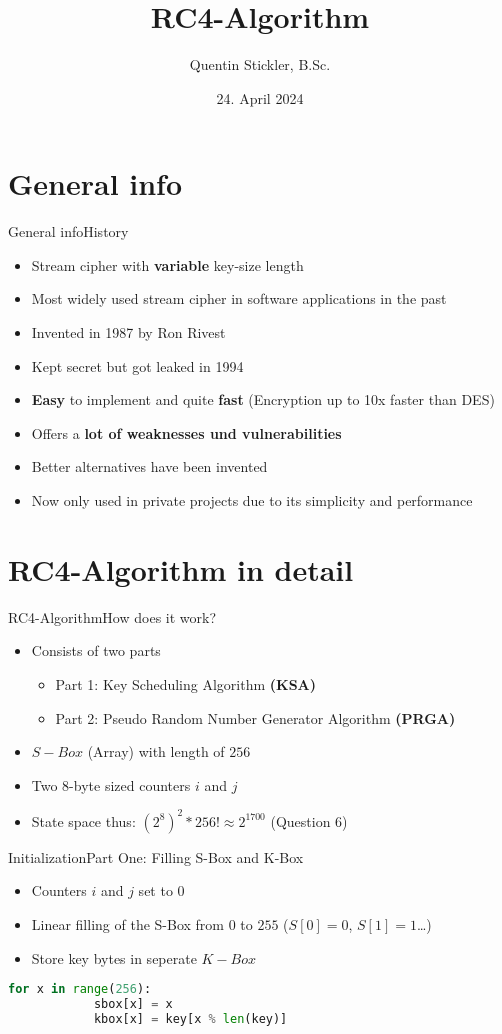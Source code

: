 \documentclass[
	aspectratio=169,	%
	onlytextwidth,		%
	t					%
	]{beamer}
\title[RC4-Algorithm]{RC4-Algorithm}
\author[Quentin Stickler]{Quentin Stickler, B.Sc.}
\date{24. April 2024} %
\begin{document}
\section{General info}

\begin{frame}[fragile]{General info}{History}
	\begin{itemize}
		\item Stream cipher with \textbf{variable} key-size length
		\item Most widely used stream cipher in software applications in the past
		\item Invented in 1987 by Ron Rivest
		\item Kept secret but got leaked in 1994
		\item \textbf{Easy} to implement and quite \textbf{fast} (Encryption up to 10x faster than DES)
		\item Offers a \textbf{lot of weaknesses und vulnerabilities}
		\item Better alternatives have been invented
		\item Now only used in private projects due to its simplicity and performance
	\end{itemize}
\end{frame}

\section{RC4-Algorithm in detail}

\begin{frame}[fragile]{RC4-Algorithm}{How does it work?}
	\begin{itemize}
		\item Consists of two parts
		\begin{itemize}
			\item Part 1: Key Scheduling Algorithm \textbf{(KSA)}
			\item Part 2: Pseudo Random Number Generator Algorithm \textbf{(PRGA)}
		\end{itemize}
		\item $S-Box$ (Array) with length of $256$
		\item Two 8-byte sized counters $i$ and $j$
		\item State space thus: $(2^{8})^2 * 256! \approx 2^{1700}$ (Question 6)
	\end{itemize}
\end{frame}

\begin{frame}[fragile]{Initialization}{Part One: Filling S-Box and K-Box}
	\begin{itemize}
		\item Counters $i$ and $j$ set to $0$
		\item Linear filling of the S-Box from $0$ to $255$ ($S[0] = 0$, $S[1] = 1$\dots)
		\item Store key bytes in seperate $K-Box$
	\end{itemize}
	\begin{lstlisting}[language=Python]
		for x in range(256):
			sbox[x] = x
			kbox[x] = key[x % len(key)]
	\end{lstlisting}
\end{frame}
\end{document}
